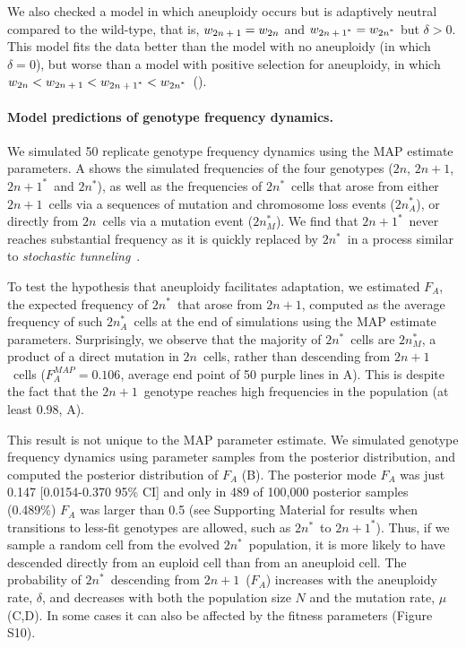 \documentclass[12pt]{article}
\newcommand{\euwt}{\emph{$2n$}}
\newcommand{\anwt}{\emph{$2n+1$}}
\newcommand{\eumt}{\emph{$2n^*$}}
\newcommand{\eumtM}{\emph{$2n^*_M$}}
\newcommand{\eumtA}{\emph{$2n^*_A$}}
\newcommand{\anmt}{\emph{$2n+1^*$}}
\begin{document}
We also checked a model in which aneuploidy occurs but is adaptively neutral compared to the wild-type, that is, $w_{\anwt} = w_{\euwt}$ and $w_{\anmt} = w_{\eumt}$ but $\delta>0$. This model fits the data better than the model with no aneuploidy (in which $\delta=0$), but worse than a model with positive selection for aneuploidy, in which $w_{\euwt}<w_{\anwt}<w_{\anmt}<w_{\eumt}$~(). 


\paragraph{Model predictions of genotype frequency dynamics.}

We simulated 50 replicate genotype frequency dynamics using the MAP estimate parameters. 
A shows the simulated frequencies of the four genotypes (\euwt, \anwt, \anmt\ and \eumt), as well as the frequencies of \eumt\ cells that arose from either \anwt\ cells via a sequences of mutation and chromosome loss events (\eumtA), or directly from \euwt\ cells via a mutation event (\eumtM).
We find that \anmt\ never reaches substantial frequency as it is quickly replaced by \eumt\ in a process similar to \emph{stochastic tunneling}~\citep{Iwasa2004,Komarova2003}.

To test the hypothesis that aneuploidy facilitates adaptation, we estimated $F_A$, the expected frequency of \eumt\ that arose from \anwt, computed as the average frequency of such \eumtA\ cells at the end of simulations using the MAP estimate parameters.
Surprisingly, we observe that the majority of \eumt\ cells are \eumtM, a product of a direct mutation in \euwt\ cells, rather than descending from \anwt\ cells ($F_A^{MAP} = 0.106$, average end point of 50 purple lines in A). 
This is despite the fact that the \anwt\ genotype reaches high frequencies in the population (at least 0.98, A).

This result is not unique to the MAP parameter estimate. 
We simulated genotype frequency dynamics using parameter samples from the posterior distribution, and computed the posterior distribution of $F_A$ (B). 
The posterior mode $F_A$ was just 0.147 [0.0154-0.370 95\% CI] and only in 489 of 100,000 posterior samples (0.489\%) $F_A$ was  larger than 0.5 (see Supporting Material for results when transitions to less-fit genotypes are allowed, such as \eumt\ to \anmt).  
Thus, if we sample a random cell from the evolved \eumt\ population, it is more likely to have descended directly from an euploid cell than from an aneuploid cell. 
The probability of \eumt\ descending from \anwt\ ($F_A$) increases with the aneuploidy rate, $\delta$, and decreases with both the population size $N$ and the mutation rate, $\mu$ (C,D). In some cases it can also be affected by the fitness parameters (Figure S10). 
\end{document}
